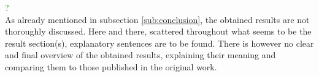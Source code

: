 \documentclass[../review.tex]{subfiles}
\begin{document}
 \textcolor{green}{\Large\checkmark ?}\\
As already mentioned in subsection \ref{sub:conclusion}, the obtained results are not thoroughly discussed. Here and there, scattered throughout what seems to be the result section(s), explanatory sentences are to be found. There is however no clear and final overview of the obtained results, explaining their meaning and comparing them to those published in the original work.
\end{document}
